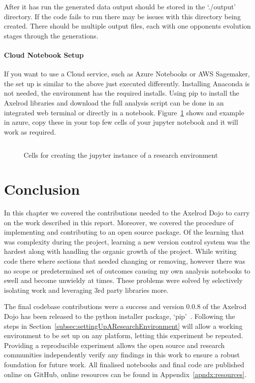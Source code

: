 After it has run the generated data output should be stored in the `./output' directory.
If the code fails to run there may be issues with this directory being created.
There should be multiple output files, each with one opponents evolution stages through the generations.

\paragraph{Cloud Notebook Setup} 
If you want to use a Cloud service, such as Azure Notebooks or AWS Sagemaker, the set up is similar to the above just executed differently.
Installing Anaconda is not needed, the environment has the required installs.
Using pip to install the Axelrod libraries and download the full analysis script can be done in an integrated web terminal or directly in a notebook.
Figure~\ref{code:jupyterExample} shows and example in azure, copy these in your top few cells of your jupyter notebook and it will work as required.

\begin{figure}[ht]
    \inputminted{python}{code_snippets/dev-examples/jupyterCells.py}
    \caption{Cells for creating the jupyter instance of a research environment}\label{code:jupyterExample}
\end{figure}

\section{Conclusion}
In this chapter we covered the contributions needed to the Axelrod Dojo to carry on the work described in this report. Moreover, we covered the procedure of implementing and contributing to an open source package.
Of the learning that was complexity during the project, learning a new version control system was the hardest along with handling the organic growth of the project.
While writing code there where sections that needed changing or removing, however there was no scope or predetermined set of outcomes causing my own analysis notebooks to swell and become unwieldy at times.
These problems were solved by selectively isolating work and leveraging 3rd party libraries more.

The final codebase contributions were a success and version 0.0.8 of the Axelrod Dojo has been released to the python installer package, `pip'~\cite{dojoV008}.
Following the steps in Section~\ref{subsec:settingUpAResearchEnvironment} will allow a working environment to be set up on any platform, letting this experiment be repeated.
Providing a reproducible experiment allows the open source and research communities independently verify any findings in this work to ensure a robust foundation for future work.
All finalised notebooks and final code are published online on GitHub, online resources can be found in Appendix~\ref{apndx:resources}.